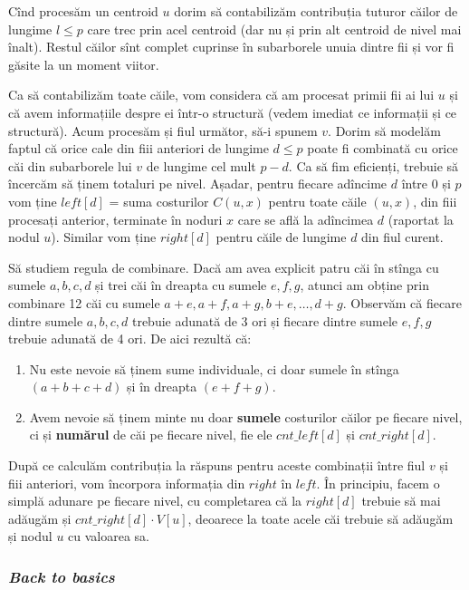 \documentclass[../main.tex]{subfiles}
\begin{document}
Cînd procesăm un centroid $u$ dorim să contabilizăm contribuția tuturor căilor de lungime $l \leq p$ care trec prin acel centroid (dar nu și prin alt centroid de nivel mai înalt). Restul căilor sînt complet cuprinse în subarborele unuia dintre fii și vor fi găsite la un moment viitor.

Ca să contabilizăm toate căile, vom considera că am procesat primii fii ai lui $u$ și că avem informațiile despre ei într-o structură (vedem imediat ce informații și ce structură). Acum procesăm și fiul următor, să-i spunem $v$. Dorim să modelăm faptul că orice cale din fiii anteriori de lungime $d \leq p$ poate fi combinată cu orice căi din subarborele lui $v$ de lungime cel mult $p - d$. Ca să fim eficienți, trebuie să încercăm să ținem totaluri pe nivel. Așadar, pentru fiecare adîncime $d$ între $0$ și $p$ vom ține $left[d]$ = suma costurilor $C(u, x)$ pentru toate căile $(u, x)$, din fiii procesați anterior, terminate în noduri $x$ care se află la adîncimea $d$ (raportat la nodul $u$). Similar vom ține $right[d]$ pentru căile de lungime $d$ din fiul curent.

Să studiem regula de combinare. Dacă am avea explicit patru căi în stînga cu sumele $a, b, c, d$ și trei căi în dreapta cu sumele $e, f, g$, atunci am obține prin combinare 12 căi cu sumele $a+e, a+f, a+g, b+e, \dots, d + g$. Observăm că fiecare dintre sumele $a, b, c, d$ trebuie adunată de 3 ori și fiecare dintre sumele $e, f, g$ trebuie adunată de 4 ori. De aici rezultă că:

\begin{enumerate}
  \item Nu este nevoie să ținem sume individuale, ci doar sumele în stînga $(a + b + c + d)$ și în dreapta $(e + f + g)$.

  \item Avem nevoie să ținem minte nu doar \textbf{sumele} costurilor căilor pe fiecare nivel, ci și \textbf{numărul} de căi pe fiecare nivel, fie ele $cnt\_left[d]$ și $cnt\_right[d]$.
\end{enumerate}

După ce calculăm contribuția la răspuns pentru aceste combinații între fiul $v$ și fiii anteriori, vom încorpora informația din $right$ în $left$. În principiu, facem o simplă adunare pe fiecare nivel, cu completarea că la $right[d]$ trebuie să mai adăugăm și $cnt\_right[d] \cdot V[u]$, deoarece la toate acele căi trebuie să adăugăm și nodul $u$ cu valoarea sa.

\subsubsection*{\textit{Back to basics}}
\end{document}
